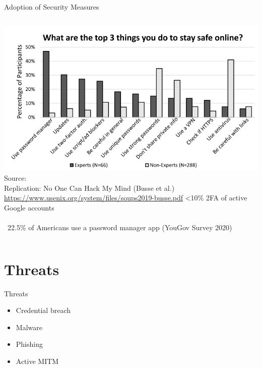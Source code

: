 \documentclass[nobackground,dvipsnames,table,aspectratio=169]{beamer}
\begin{document}
\begin{frame}{Adoption of Security Measures}
    \begin{columns}
            \includegraphics[width=\textwidth]{stay-safe-online}
            \tiny
            Source:\\
            Replication: No One Can Hack My Mind (Busse  et al.)\\
            \url{https://www.usenix.org/system/files/soups2019-busse.pdf}
            <10\% 2FA of active Google accounts\\~\\
            ~22.5\% of Americans use a password manager app (YouGov Survey 2020)
    \end{columns}
\end{frame}

\section{Threats}

\begin{frame}{Threats}
    \Large
    \begin{itemize}
        \item Credential breach
        \item Malware
        \item Phishing
        \item Active MITM
    \end{itemize}
\end{frame}
\end{document}
